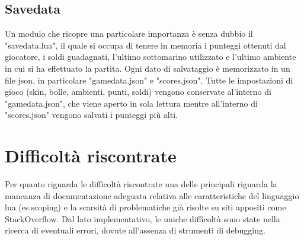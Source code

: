 \documentclass[15pt]{article}
\begin{document}
\subsection{Savedata}
Un modulo che ricopre una particolare importanza è senza dubbio il "savedata.lua", il quale si occupa di tenere in memoria i punteggi ottenuti dal giocatore, i soldi guadagnati, l'ultimo sottomarino utilizzato e l'ultimo ambiente in cui si ha effettuato la partita. Ogni dato di salvataggio è memorizzato in un file json, in particolare "gamedata.json" e "scores.json". 
Tutte le impostazioni di gioco  (skin, bolle, ambienti, punti, soldi) vengono conservate al'interno di "gamedata.json", che viene aperto in sola lettura mentre all'interno di "scores.json" vengono salvati i punteggi più alti. 

\section{Difficoltà riscontrate}
Per quanto riguarda le difficoltà riscontrate una delle principali riguarda la mancanza di documentazione adeguata relativa alle caratteristiche del linguaggio lua (es.scoping) e la scarsità di problematiche già risolte su siti appositi come StackOverflow. 
Dal lato implementativo, le uniche difficoltà sono state nella ricerca di eventuali errori, dovute all'assenza di strumenti di debugging.
\end{document}
